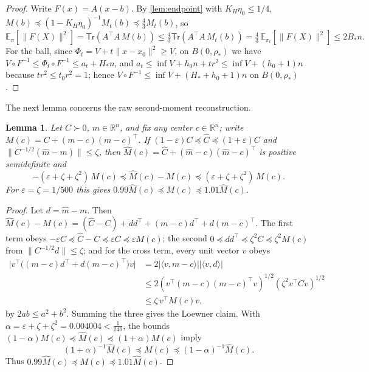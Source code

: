 \documentclass[11pt]{article}
\numberwithin{equation}{section}
\newtheorem{lemma}{Lemma}[section]
\theoremstyle{definition}
\newcommand{\eps}{\varepsilon}
\newcommand{\R}{\mathbb{R}}
\newcommand{\E}[2]{\mathbb{E}_{#1}\left[#2\right]}
\newcommand{\Tr}[1]{\mathsf{Tr}\left(#1\right)}
\begin{document}
\begin{proof}
Write $F(x)=A(x-b)$.
By \cref{lem:endpoint} with $K_H\eta_0\leq1/4$,
$M(b)\preceq(1-K_H\eta_0)^{-1}M_t(b) \preceq\frac43M_t(b)$, so
\[
\E{\pi}{\|F(X)\|^2}
=\Tr{A^\top A\,M(b)}
\leq\tfrac43\Tr{A^\top A\,M_t(b)}
=\tfrac43\,\E{\pi_t}{\|F(X)\|^2}
\leq2B_*n .
\]
For the ball, since $\Phi_t=V+t\|x-x_0\|^2\geq V$, on
$B(0,\rho_*)$ we have
$V\circ F^{-1}\leq\Phi_t\circ F^{-1}\leq a_t+H_*n$, and
$a_t\leq\inf V+h_0n+tr^2\leq\inf V+(h_0+1)n$ because
$tr^2\leq t_0r^2=1$; hence
$V\circ F^{-1}\leq\inf V+(H_*+h_0+1)n$ on
$B(0,\rho_*)$.
\end{proof}

The next lemma concerns the raw second-moment reconstruction.

\begin{lemma}
\label{lem:raw}
Let $C\succ0$,
$m\in\R^n$, and fix any center
$c\in\R^n$; write
$M(c)=C+(m-c)(m-c)^\top$.
If $(1-\eps)C\preceq\widehat C\preceq(1+\eps)C$ and
$\|C^{-1/2}(\widehat m-m)\|\leq\zeta$, then
$\widehat M(c)=\widehat C+(\widehat m-c)(\widehat m-c)^\top$ is positive
semidefinite and
\[
-(\eps+\zeta+\zeta^2)\,M(c)
\preceq\widehat M(c)-M(c)
\preceq(\eps+\zeta+\zeta^2)\,M(c).
\]
For $\eps=\zeta=1/500$ this gives
$0.99\widehat M(c)\preceq M(c)\preceq1.01\widehat M(c)$.
\end{lemma}

\begin{proof}
Let $d=\widehat m-m$.
Then $\widehat M(c)-M(c)=(\widehat C-C)+dd^\top+(m-c)d^\top+d(m-c)^\top$.
The first term obeys $-\eps C\preceq\widehat C-C\preceq\eps C\preceq\eps M(c)$;
the second
$0\preceq dd^\top\preceq\zeta^2C\preceq\zeta^2M(c)$ from
$\|C^{-1/2}d\|\leq\zeta$; and for the cross term, every unit vector
$v$ obeys
\[
\begin{aligned}
\bigl|v^\top\bigl((m-c)d^\top+d(m-c)^\top\bigr)v\bigr|
&=2|\langle v,m-c\rangle||\langle v,d\rangle|\\
&\leq2(v^\top(m-c)(m-c)^\top v)^{1/2}(\zeta^2v^\top Cv)^{1/2}\\
&\leq\zeta\,v^\top M(c)v,
\end{aligned}
\]
by $2ab\leq a^2+b^2$.
Summing the three gives the Loewner claim.
With $\alpha=\eps+\zeta+\zeta^2=0.004004<\frac1{249}$,
the bounds
$(1-\alpha)M(c)\preceq\widehat M(c)\preceq(1+\alpha)M(c)$ imply
\[
(1+\alpha)^{-1}\widehat M(c)
\preceq M(c)
\preceq(1-\alpha)^{-1}\widehat M(c).
\]
Thus $0.99\widehat M(c)\preceq M(c)\preceq1.01\widehat M(c)$.
\end{proof}
\end{document}
